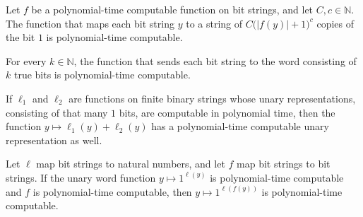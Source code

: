 \begin{theorem}
\label{Complexity.PolyHierarchy.unaryPT_poly}
\leanok
{}
Let $f$ be a polynomial-time computable function on bit strings, and let
$C,c\in\mathbb{N}$. The function that maps each bit string $y$ to a string of
$C\bigl(|f(y)|+1\bigr)^c$ copies of the bit $1$ is polynomial-time computable.
\end{theorem}

\begin{theorem}
\label{Complexity.PolyHierarchy.unaryPT_const}
\leanok
{}
For every $k\in\mathbb N$, the function that sends each bit string to the word
consisting of $k$ true bits is polynomial-time computable.
\end{theorem}

\begin{theorem}
\label{Complexity.PolyHierarchy.UnaryPT.add}
\leanok
{}
If $\ell_1$ and $\ell_2$ are functions on finite binary strings whose unary
representations, consisting of that many $1$ bits, are computable in polynomial time,
then the function $y\mapsto \ell_1(y)+\ell_2(y)$ has a polynomial-time computable unary
representation as well.
\end{theorem}

\begin{theorem}
\label{Complexity.PolyHierarchy.UnaryPT.comp}
\leanok
{}
Let $\ell$ map bit strings to natural numbers, and let $f$ map bit strings to bit
strings. If the unary word function $y\mapsto 1^{\ell(y)}$ is polynomial-time computable
and $f$ is polynomial-time computable, then $y\mapsto 1^{\ell(f(y))}$ is polynomial-time
computable.
\end{theorem}

